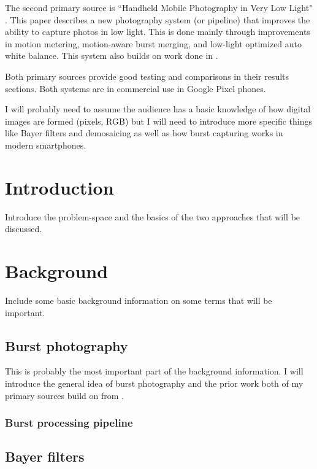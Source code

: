 \documentclass{sig-alternate}
\begin{document}
The second primary source is ``Handheld Mobile Photography in Very Low Light" \cite{Liba2019}. This paper describes a new photography system (or pipeline) that improves the ability to capture photos in low light. This is done mainly through improvements in motion metering, motion-aware burst merging, and low-light optimized auto white balance. This system also builds on work done in \cite{Hasinoff2016}.

Both primary sources provide good testing and comparisons in their results sections. Both systems are in commercial use in Google Pixel phones.

I will probably need to assume the audience has a basic knowledge of how digital images are formed (pixels, RGB) but I will need to introduce more specific things like Bayer filters and demosaicing as well as how burst capturing works in modern smartphones.

\section{Introduction}

Introduce the problem-space and the basics of the two approaches that will be discussed.

\section{Background}

Include some basic background information on some terms that will be important.

\subsection{Burst photography}

This is probably the most important part of the background information. I will introduce the general idea of burst photography and the prior work both of my primary sources build on from \cite{Hasinoff2016}.

\subsubsection{Burst processing pipeline}

\subsection{Bayer filters}
\end{document}
